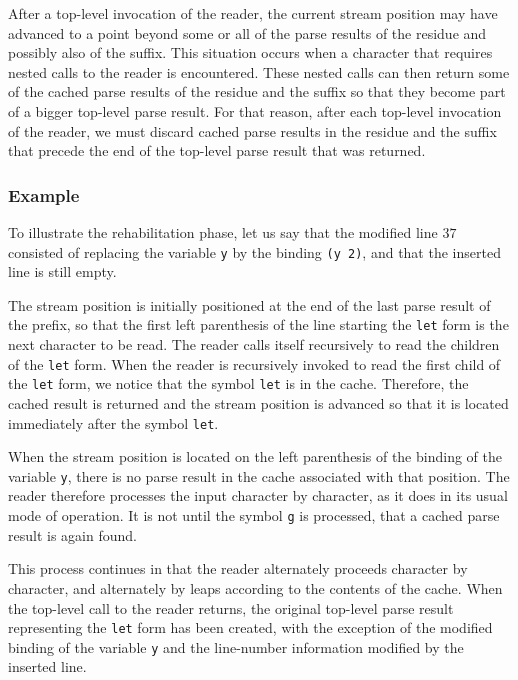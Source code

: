 After a top-level invocation of the reader, the current stream
position may have advanced to a point beyond some or all of the parse
results of the residue and possibly also of the suffix.  This
situation occurs when a character that requires nested calls to the
reader is encountered.  These nested calls can then return some of the
cached parse results of the residue and the suffix so that they become
part of a bigger top-level parse result.  For that reason, after each
top-level invocation of the reader, we must discard cached parse
results in the residue and the suffix that precede the end of the
top-level parse result that was returned.

\subsubsection{Example}

To illustrate the rehabilitation phase, let us say that the modified
line $37$ consisted of replacing the variable \texttt{y} by the
binding \texttt{(y 2)}, and that the inserted line is still empty.

The stream position is initially positioned at the end of the last
parse result of the prefix, so that the first left parenthesis of the
line starting the \texttt{let} form is the next character to be read.
The reader calls itself recursively to read the children of the
\texttt{let} form.  When the reader is recursively invoked to read the
first child of the \texttt{let} form, we notice that the symbol
\texttt{let} is in the cache.  Therefore, the cached result is
returned and the stream position is advanced so that it is located
immediately after the symbol \texttt{let}.

When the stream position is located on the left parenthesis of the
binding of the variable \texttt{y}, there is no parse result in the
cache associated with that position.  The reader therefore processes
the input character by character, as it does in its usual mode of
operation.  It is not until the symbol \texttt{g} is processed, that a
cached parse result is again found.

This process continues in that the reader alternately proceeds
character by character, and alternately by leaps according to the
contents of the cache.  When the top-level call to the reader returns,
the original top-level parse result representing the \texttt{let} form
has been created, with the exception of the modified binding of the
variable \texttt{y} and the line-number information modified by the
inserted line.

